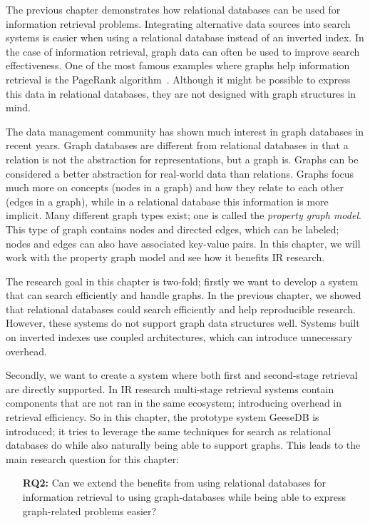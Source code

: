 The previous chapter demonstrates how relational databases can be used for information retrieval problems. Integrating alternative data sources into search systems is easier when using a relational database instead of an inverted index. In the case of information retrieval, graph data can often be used to improve search effectiveness. One of the most famous examples where graphs help information retrieval is the PageRank algorithm~\citep{pagerank}. Although it might be possible to express this data in relational databases, they are not designed with graph structures in mind. 

The data management community has shown much interest in graph databases in recent years. Graph databases are different from relational databases in that a relation is not the abstraction for representations, but a graph is. Graphs can be considered a better abstraction for real-world data than relations. Graphs focus much more on concepts (nodes in a graph) and how they relate to each other (edges in a graph), while in a relational database this information is more implicit. Many different graph types exist; one is called the \emph{property graph model}. This type of graph contains nodes and directed edges, which can be labeled; nodes and edges can also have associated key-value pairs. In this chapter, we will work with the property graph model and see how it benefits IR research.

The research goal in this chapter is two-fold; firstly we want to develop a system that can search efficiently and handle graphs. In the previous chapter, we showed that relational databases could search efficiently and help reproducible research. However, these systems do not support graph data structures well. Systems built on inverted indexes use coupled architectures, which can introduce unnecessary overhead.

Secondly, we want to create a system where both first and second-stage retrieval are directly supported. In IR research multi-stage retrieval systems contain components that are not ran in the same ecosystem; introducing overhead in retrieval efficiency. 
So in this chapter, the prototype system GeeseDB is introduced; it tries to leverage the same techniques for search as relational databases do while also naturally being able to support graphs. This leads to the main research question for this chapter:

\begin{itemize}
	\item[\textbf{RQ2:}] Can we extend the benefits from using relational databases for information retrieval to using graph-databases while being able to express graph-related problems easier?
\end{itemize} 

